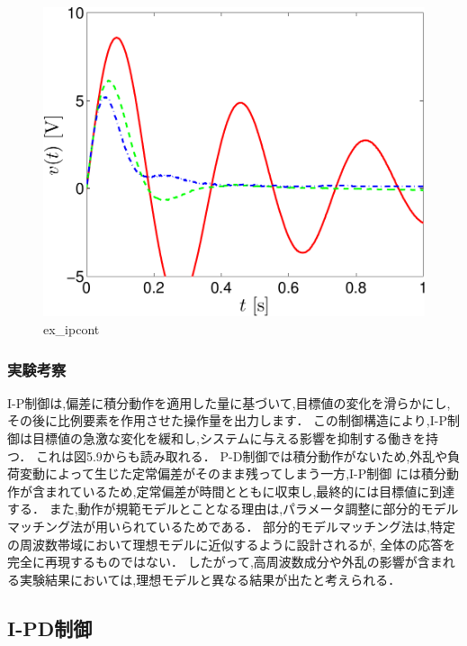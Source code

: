 \begin{figure}[h]
  \centering
  \includegraphics[scale=0.5]{sozai/figure_ipcont_volt-crop.pdf}
  \caption{ex\_ipcont}
\end{figure}

\subsubsection{実験考察}
I-P制御は,偏差に積分動作を適用した量に基づいて,目標値の変化を滑らかにし,
その後に比例要素を作用させた操作量を出力します．
この制御構造により,I-P制御は目標値の急激な変化を緩和し,システムに与える影響を抑制する働きを持つ．
これは図5.9からも読み取れる．
P-D制御では積分動作がないため,外乱や負荷変動によって生じた定常偏差がそのまま残ってしまう一方,I-P制御
には積分動作が含まれているため,定常偏差が時間とともに収束し,最終的には目標値に到達する．
また,動作が規範モデルとことなる理由は,パラメータ調整に部分的モデルマッチング法が用いられているためである．
部分的モデルマッチング法は,特定の周波数帯域において理想モデルに近似するように設計されるが,
全体の応答を完全に再現するものではない．
したがって,高周波数成分や外乱の影響が含まれる実験結果においては,理想モデルと異なる結果が出たと考えられる．

\subsection{I-PD制御}

